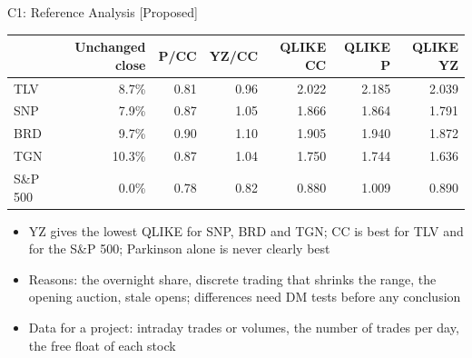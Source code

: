 \ifsolutions
\begin{frame}{C1: Reference Analysis [Proposed]}
\itemsize{\footnotesize}
\begin{center}
\footnotesize
\begin{tabular}{lrrrrrr}
\toprule
& \textbf{Unchanged close} & P/CC & YZ/CC & QLIKE CC & QLIKE P & QLIKE YZ \\
\midrule
TLV & 8.7\% & 0.81 & 0.96 & 2.022 & 2.185 & 2.039 \\
SNP & 7.9\% & 0.87 & 1.05 & 1.866 & 1.864 & 1.791 \\
BRD & 9.7\% & 0.90 & 1.10 & 1.905 & 1.940 & 1.872 \\
TGN & 10.3\% & 0.87 & 1.04 & 1.750 & 1.744 & 1.636 \\
S\&P 500 & 0.0\% & 0.78 & 0.82 & 0.880 & 1.009 & 0.890 \\
\bottomrule
\end{tabular}
\end{center}
\begin{itemize}
    \item YZ gives the lowest QLIKE for SNP, BRD and TGN; CC is best for TLV and for the S\&P 500; Parkinson alone is never clearly best
    \item Reasons: the overnight share, discrete trading that shrinks the range, the opening auction, stale opens; differences need DM tests before any conclusion
    \item Data for a project: intraday trades or volumes, the number of trades per day, the free float of each stock
\end{itemize}
\end{frame}
\fi

